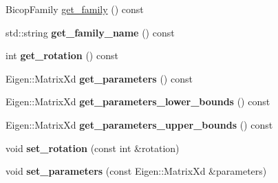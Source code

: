 {\bf }\par
\begin{DoxyCompactItemize}
\item 
Bicop\+Family \hyperlink{classvinecopulib_1_1_bicop_a68ab3556ee3bb3d02814fd978573bf3b}{get\+\_\+family} () const 
\item 
std\+::string {\bfseries get\+\_\+family\+\_\+name} () const \hypertarget{classvinecopulib_1_1_bicop_a4d4fbc0fdca17564c23f4814d5d2fbe7}{}\label{classvinecopulib_1_1_bicop_a4d4fbc0fdca17564c23f4814d5d2fbe7}

\item 
int {\bfseries get\+\_\+rotation} () const \hypertarget{classvinecopulib_1_1_bicop_ab8e52577a50fbfc57277f9240d8eac03}{}\label{classvinecopulib_1_1_bicop_ab8e52577a50fbfc57277f9240d8eac03}

\item 
Eigen\+::\+Matrix\+Xd {\bfseries get\+\_\+parameters} () const \hypertarget{classvinecopulib_1_1_bicop_a93ab0dd89826e50b209ea3760f251f2f}{}\label{classvinecopulib_1_1_bicop_a93ab0dd89826e50b209ea3760f251f2f}

\item 
Eigen\+::\+Matrix\+Xd {\bfseries get\+\_\+parameters\+\_\+lower\+\_\+bounds} () const \hypertarget{classvinecopulib_1_1_bicop_a35bd07862fbce9dd2b78c0d25c8e8352}{}\label{classvinecopulib_1_1_bicop_a35bd07862fbce9dd2b78c0d25c8e8352}

\item 
Eigen\+::\+Matrix\+Xd {\bfseries get\+\_\+parameters\+\_\+upper\+\_\+bounds} () const \hypertarget{classvinecopulib_1_1_bicop_a5ac1336e4640af7ebaa8b6dc7147eb89}{}\label{classvinecopulib_1_1_bicop_a5ac1336e4640af7ebaa8b6dc7147eb89}

\item 
void {\bfseries set\+\_\+rotation} (const int \&rotation)\hypertarget{classvinecopulib_1_1_bicop_a8781e97362a14f86ecf547e6c5257a44}{}\label{classvinecopulib_1_1_bicop_a8781e97362a14f86ecf547e6c5257a44}

\item 
void {\bfseries set\+\_\+parameters} (const Eigen\+::\+Matrix\+Xd \&parameters)\hypertarget{classvinecopulib_1_1_bicop_ac8d1d4266b0fd7e2f971d0149f881ef9}{}\label{classvinecopulib_1_1_bicop_ac8d1d4266b0fd7e2f971d0149f881ef9}

\end{DoxyCompactItemize}

